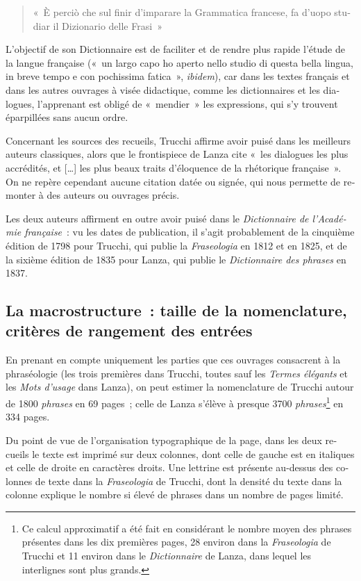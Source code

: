 \documentclass[output=paper,booklanguage=french]{langscibook}
\begin{document}
\begin{otherlanguage}{french}
\begin{quote}
    «~È perciò che sul finir d’imparare la Grammatica francese, fa d’uopo studiar il Dizionario delle Frasi~»
\end{quote}

L’objectif de son Dictionnaire est de faciliter et de rendre plus rapide l’étude de la langue française («~un largo capo ho aperto nello studio di questa bella lingua, in breve tempo e con pochissima fatica~», \emph{ibidem}), car dans les textes français et dans les autres ouvrages à visée didactique, comme les dictionnaires et les dialogues, l’apprenant est obligé de «~mendier~» les expressions, qui s’y trouvent éparpillées sans aucun ordre.

Concernant les sources des recueils, Trucchi affirme avoir puisé dans les meilleurs auteurs classiques, alors que le frontispiece de Lanza cite «~les dialogues les plus accrédités, et […] les plus beaux traits d’éloquence de la rhétorique française~». On ne repère cependant aucune citation datée ou signée, qui nous permette de remonter à des auteurs ou ouvrages précis. 

Les deux auteurs affirment en outre avoir puisé dans le \emph{Dictionnaire de l’Académie française}~: vu les dates de publication, il s’agit probablement de la cinquième édition de 1798 pour Trucchi, qui publie la \emph{Fraseologia} en 1812 et en 1825, et de la sixième édition de 1835 pour Lanza, qui publie le \emph{Dictionnaire des phrases} en 1837.

\subsection{La macrostructure~: taille de la nomenclature, critères de rangement des entrées}

En prenant en compte uniquement les parties que ces ouvrages consacrent à la phraséologie (les trois premières dans Trucchi, toutes sauf les \emph{Termes élégants} et les \emph{Mots d’usage} dans Lanza), on peut estimer la nomenclature de Trucchi autour de 1800 \emph{phrases} en 69 pages~; celle de Lanza s’élève à presque 3700 \emph{phrases}\footnote{Ce calcul approximatif a été fait en considérant le nombre moyen des phrases présentes dans les dix premières pages, 28 environ dans la \emph{Fraseologia} de Trucchi et 11 environ dans le \emph{Dictionnaire} de Lanza, dans lequel les interlignes sont plus grands.} en 334 pages.

Du point de vue de l’organisation typographique de la page, dans les deux recueils le texte est imprimé sur deux colonnes, dont celle de gauche est en italiques et celle de droite en caractères droits. Une lettrine est présente au-dessus des colonnes de texte dans la \emph{Fraseologia} de Trucchi, dont la densité du texte dans la colonne explique le nombre si élevé de phrases dans un nombre de pages limité.


\end{otherlanguage}
\end{document}
